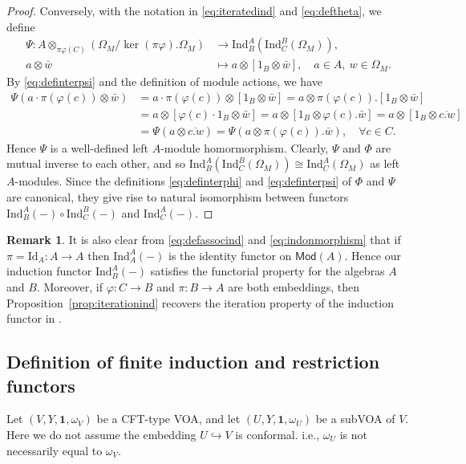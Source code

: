 \documentclass[12pt,a4paper,reqno]{amsart}
\numberwithin{equation}{section}
\numberwithin{equation}{section}
\theoremstyle{definition}
\newtheorem{remark}[thm]{Remark}
\def \ra {\rightarrow}
\def \om{\omega}
\def\hr{\hookrightarrow}
\def \vac {\mathbf{1}}
\def\Id{\mathrm{Id}}
\def\Ind{\mathrm{Ind}}
\def\o{\otimes}
\def\Om{\Omega}
\def\Ind{\mathrm{Ind}}
\def\Mod{\mathsf{Mod}}
\begin{document}
\begin{proof}
		Conversely, with the notation in \eqref{eq:iteratedind} and \eqref{eq:deftheta}, we define 
		\begin{equation}\label{eq:definterpsi}
			\begin{aligned}
				\Psi: A\o_{\pi\varphi(C)}(\Om_M/\ker(\pi\varphi).\Om_M)&\ra \Ind^A_B\left(\Ind^B_C(\Om_M)\right),\\
				a\o \bar{w}&\mapsto a\o[1_B\o\bar{w}],\quad a\in A,\ w\in \Om_M.
			\end{aligned}
		\end{equation}
		By \eqref{eq:definterpsi} and the definition of module actions, we have 
		\begin{align*}
			\Psi(a\cdot \pi(\varphi(c))\o \bar{w})&=a\cdot \pi(\varphi(c))\o [1_B\o \bar{w}]=a\o \pi(\varphi(c)).[1_B\o \bar{w}]\\
			&=a\o [\varphi(c)\cdot 1_B\o \bar{w}]=a\o [1_B\o \varphi(c).\bar{w}]=a\o [1_B\o \overline{c.w}]\\
			&=\Psi(a\o \overline{c.w})=\Psi(a\o \pi(\varphi(c)).\bar{w}),\quad \forall c\in C.
		\end{align*}
		Hence $\Psi$ is a well-defined left $A$-module homormorphism. Clearly, $\Psi$ and $\Phi$ are mutual inverse to each other, and so $\Ind^A_B(\Ind^B_C(\Om_M))\cong \Ind_C^A(\Om_M)$ as left $A$-modules. Since the definitions \eqref{eq:definterphi} and \eqref{eq:definterpsi} of $\Phi$ and $\Psi$ are canonical, they give rise to natural isomorphism between functors $\Ind^A_B(-)\circ \Ind^B_C(-)$ and $ \Ind^A_C(-)$. 
	\end{proof}
	
	\begin{remark}
		It is also clear from \eqref{eq:defassocind} and \eqref{eq:indonmorphism}  that if $\pi=\Id_A:A\ra A$ then $\Ind_A^A(-)$ is the identity functor on $\Mod(A)$. Hence our induction functor $\Ind^A_B(-)$ satisfies the functorial property for the algebras $A$ and $B$. Moreover, if $\varphi:C\ra B$ and $\pi:B\ra A$ are both embeddings, then Proposition~\ref{prop:iterationind} recovers the iteration property of the induction functor in \cite{Hig55}. 
	\end{remark}
	
	
	
	\subsection{Definition of finite induction and restriction functors}\label{sec:2.3}
	
	Let $(V,Y,\vac,\om_V)$ be a CFT-type VOA, and let $(U,Y,\vac,\om_U)$ be a subVOA of $V$. 
	Here we do not assume the embedding $U\hr V$ is conformal. i.e., $\om_U$ is not necessarily equal to $\om_V$. 
	
\end{document}
